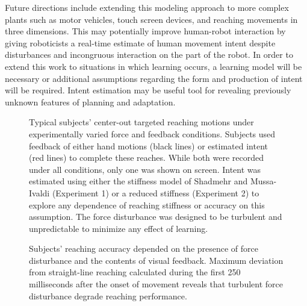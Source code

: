 \documentclass[letterpaper, 10 pt, conference]{ieeeconf}  %
\begin{document}
Future directions include extending this modeling approach to more complex plants such as motor vehicles, touch screen devices, and reaching movements in three dimensions. This may potentially improve human-robot interaction by giving roboticists a real-time estimate of human movement intent despite disturbances and incongruous interaction on the part of the robot. In order to extend this work to situations in which learning occurs, a learning model will be necessary or additional assumptions regarding the form and production of intent will be required. Intent estimation may be useful tool for revealing previously unknown features of planning and adaptation.

\begin{figure}[thpb]
      \centering
      \caption{Typical subjects' center-out targeted reaching motions under experimentally varied force and feedback conditions. Subjects used feedback of either hand motions (black lines) or estimated intent (red lines) to complete these reaches. While both were recorded under all conditions, only one was shown on screen. Intent was estimated using either the stiffness model of Shadmehr and Mussa-Ivaldi (Experiment 1) or a reduced stiffness (Experiment 2) to explore any dependence of reaching stiffness or accuracy on this assumption. The force disturbance was designed to be turbulent and unpredictable to minimize any effect of learning.}
      \label{typicalsubject}
   \end{figure}
   
   \begin{figure}[thpb]
      \centering
      \caption{Subjects' reaching accuracy depended on the presence of force disturbance and the contents of visual feedback. Maximum deviation from straight-line reaching calculated during the first 250 milliseconds after the onset of movement reveals that turbulent force disturbance degrade reaching performance. }
      \label{figurelabel}
   \end{figure}
   
\end{document}
